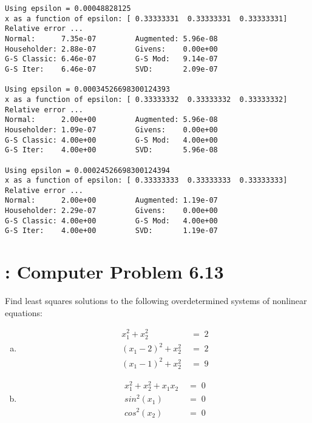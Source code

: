 \documentclass[paper=a4, fontsize=11pt]{scrartcl}
\numberwithin{equation}{section}		%
\numberwithin{figure}{section}			%
\numberwithin{table}{section}				%
\begin{document}
\begin{verbatim}
Using epsilon = 0.00048828125
x as a function of epsilon: [ 0.33333331  0.33333331  0.33333331]
Relative error ...
Normal:      7.35e-07         Augmented: 5.96e-08
Householder: 2.88e-07         Givens:    0.00e+00
G-S Classic: 6.46e-07         G-S Mod:   9.14e-07
G-S Iter:    6.46e-07         SVD:       2.09e-07

Using epsilon = 0.00034526698300124393
x as a function of epsilon: [ 0.33333332  0.33333332  0.33333332]
Relative error ...
Normal:      2.00e+00         Augmented: 5.96e-08
Householder: 1.09e-07         Givens:    0.00e+00
G-S Classic: 4.00e+00         G-S Mod:   4.00e+00
G-S Iter:    4.00e+00         SVD:       5.96e-08

Using epsilon = 0.00024526698300124394
x as a function of epsilon: [ 0.33333333  0.33333333  0.33333333]
Relative error ...
Normal:      2.00e+00         Augmented: 1.19e-07
Householder: 2.29e-07         Givens:    0.00e+00
G-S Classic: 4.00e+00         G-S Mod:   4.00e+00
G-S Iter:    4.00e+00         SVD:       1.19e-07
\end{verbatim}


\vspace{4mm}
\section{: Computer Problem 6.13}
Find least squares solutions to the following overdetermined systems of nonlinear equations:
\begin{enumerate}[(a)]
	\item \begin{align*}
		x_1^2 + x_2^2 \; &= \; 2 \\
		(x_1 - 2)^2 + x_2^2 \; &= \; 2 \\
		(x_1 - 1)^2 + x_2^2 \; &= \; 9
	\end{align*}
	\item \begin{align*}
		x_1^2 + x_2^2 + x_1 x_2 \; &= \; 0 \\
		sin^2(x_1) \; &= \; 0 \\
		cos^2(x_2) \; &= \; 0
	\end{align*}
\end{enumerate}

\vspace{4mm}
\end{document}
